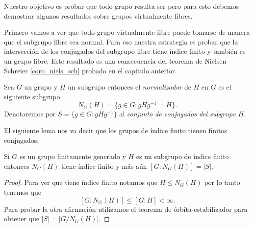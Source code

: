 \documentclass[tesis.tex]{subfiles}
\begin{document}
Nuestro objetivo es probar que todo grupo \vl resulta ser \ic pero para esto debemos  demostrar algunos resultados sobre grupos virtualmente libres.

Primero vamos a ver que todo grupo virtualmente libre puede tomarse de manera que el subgrupo libre sea normal.
Para eso nuestra estrategia es probar que la intersección de los conjugados del subgrupo libre tiene índice finito y también es un grupo libre.
Este resultado es una consecuencia del teorema de Nielsen--Schreier \ref{coro_niels_sch} probado en el capítulo anterior.


\begin{deff}
	Sea $G$ un grupo y $H$ un subgrupo entonces el \emph{normalizador} de $H$ en $G$ es el siguiente subgrupo
	\begin{equation*}
		N_G(H) = \{ g\in G : gHg^{-1} = H  \}.
	\end{equation*}
	Denotaremos por $S= \{ g \in G :  gHg^{-1} \}$ al \emph{conjunto de conjugados del subgrupo $H$}.

\end{deff}

 

El siguiente lema nos va decir que los grupos de índice finito tienen finitos conjugados.

\begin{lema}\label{lema_normalizador_conjugados}
	Si $G$ es un grupo finitamente generado y $H$ es un subgrupo de índice finito entonces $N_G(H)$ tiene índice finito y más aún $[G:N_G(H)] = |S|$.
\end{lema}
\begin{proof}
	Para ver que tiene índice finito notamos que $H \le N_G(H)$ por lo tanto tenemos que 
	\[
		[G:N_G(H)] \le [G:H] < \infty.
		\]
	Para probar la otra afirmación utilizamos el teorema de órbita-estabilizador para obtener que $|S| = |G/N_{G}(H)|$.

\end{proof}
\end{document}
